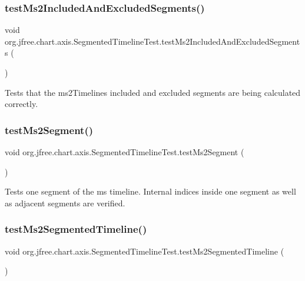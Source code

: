 \subsubsection{\texorpdfstring{test\+Ms2\+Included\+And\+Excluded\+Segments()}{testMs2IncludedAndExcludedSegments()}}
{\footnotesize\ttfamily void org.\+jfree.\+chart.\+axis.\+Segmented\+Timeline\+Test.\+test\+Ms2\+Included\+And\+Excluded\+Segments (\begin{DoxyParamCaption}{ }\end{DoxyParamCaption})}

Tests that the ms2\+Timeline\textquotesingle{}s included and excluded segments are being calculated correctly. \mbox{\label{classorg_1_1jfree_1_1chart_1_1axis_1_1_segmented_timeline_test_a5f2ec7f675b17ac8792a7c7175e34012}} 
\subsubsection{\texorpdfstring{test\+Ms2\+Segment()}{testMs2Segment()}}
{\footnotesize\ttfamily void org.\+jfree.\+chart.\+axis.\+Segmented\+Timeline\+Test.\+test\+Ms2\+Segment (\begin{DoxyParamCaption}{ }\end{DoxyParamCaption})}

Tests one segment of the ms timeline. Internal indices inside one segment as well as adjacent segments are verified. \mbox{\label{classorg_1_1jfree_1_1chart_1_1axis_1_1_segmented_timeline_test_a122ebaf8de16ca9372de060bce816b80}} 
\subsubsection{\texorpdfstring{test\+Ms2\+Segmented\+Timeline()}{testMs2SegmentedTimeline()}}
{\footnotesize\ttfamily void org.\+jfree.\+chart.\+axis.\+Segmented\+Timeline\+Test.\+test\+Ms2\+Segmented\+Timeline (\begin{DoxyParamCaption}{ }\end{DoxyParamCaption})}

